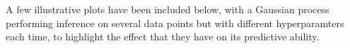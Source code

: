 % 
% 
% 
% 

% 

A few illustrative plots have been included below, with a Gaussian process performing inference on several data points but with different hyperparamters each time, to highlight the effect that they have on its predictive ability.

